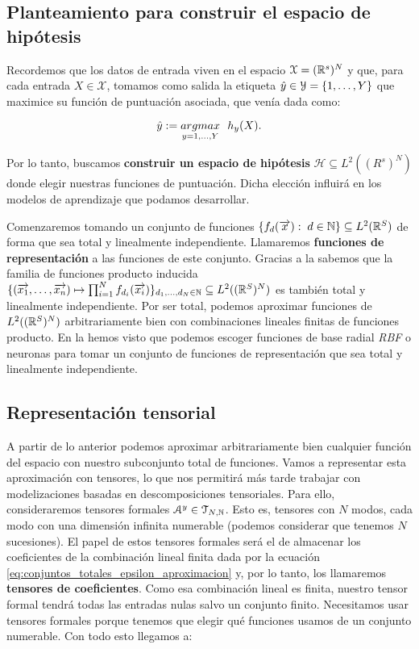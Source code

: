 \subsection{Planteamiento para construir el espacio de hipótesis} \label{sec:justificacion_func_repr}

Recordemos que los datos de entrada viven en el espacio $\mathcal{X} = (\mathbb{R}^s)^N$ y que, para cada entrada $X \in \mathcal{X}$, tomamos como salida la etiqueta $\hat{y} \in \mathcal{Y} = \{ 1, \ldots, Y \}$ que maximice su función de puntuación asociada, que venía dada como:

\begin{equation}
	\hat{y} := \underset{y = 1, \ldots, Y}{argmax} \ \  h_y(X).
\end{equation}

Por lo tanto, buscamos \textbf{construir un espacio de hipótesis} $\mathcal{H} \subseteq L^2((R^s)^N)$ donde elegir nuestras funciones de puntuación. Dicha elección influirá en los modelos de aprendizaje que podamos desarrollar.

Comenzaremos tomando un conjunto de funciones $\{ f_d(\overrightarrow{x}): \; d \in \mathbb{N} \} \subseteq L^2(\mathbb{R}^S)$ de forma que sea total y linealmente independiente. Llamaremos \textbf{funciones de representación} a las funciones de este conjunto. Gracias a la  sabemos que la familia de funciones producto inducida $\{ (\overrightarrow{x_1}, \ldots, \overrightarrow{x_n}) \mapsto \prod_{i = 1}^N f_{d_i}(\overrightarrow{x_i})  \}_{d_1, \ldots, d_N \in \mathbb{N}} \subseteq L^2((\mathbb{R}^S)^N)$ es también total y linealmente independiente. Por ser total, podemos aproximar funciones de $L^2((\mathbb{R}^S)^N)$ arbitrariamente bien con combinaciones lineales finitas de funciones producto. En la  hemos visto que podemos escoger funciones de base radial \textit{RBF} o neuronas para tomar un conjunto de funciones de representación que sea total y linealmente independiente.

\subsection{Representación tensorial}

A partir de lo anterior podemos aproximar arbitrariamente bien cualquier función del espacio con nuestro subconjunto total de funciones. Vamos a representar esta aproximación con tensores, lo que nos permitirá más tarde trabajar con modelizaciones basadas en descomposiciones tensoriales. Para ello, consideraremos tensores formales $\mathcal{A}^y \in \mathcal{T}_{N, \mathbb{N}}$. Esto es, tensores con $N$ modos, cada modo con una dimensión infinita numerable (podemos considerar que tenemos $N$ sucesiones). El papel de estos tensores formales será el de almacenar los coeficientes de la combinación lineal finita dada por la ecuación \eqref{eq:conjuntos_totales_epsilon_aproximacion} y, por lo tanto, los llamaremos \textbf{tensores de coeficientes}. Como esa combinación lineal es finita, nuestro tensor formal tendrá todas las entradas nulas salvo un conjunto finito. Necesitamos usar tensores formales porque tenemos que elegir qué funciones usamos de un conjunto numerable. Con todo esto llegamos a:

